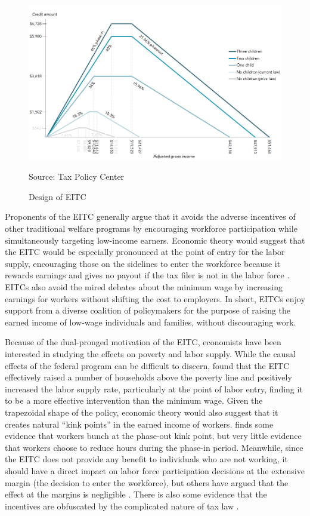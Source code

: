 \documentclass{article}
\begin{document}
 \begin{figure}[H]
    \caption{Design of EITC}
    \begin{center}
        \includegraphics[width=.85\textwidth]{eitc_design}
    \end{center}
	\footnotesize
    \label{fig:tax}{Source: Tax Policy Center}
\end{figure}

Proponents of the EITC generally argue that it avoids the adverse incentives of other traditional welfare programs by encouraging workforce participation while simultaneously targeting low-income earners. Economic theory would suggest that the EITC would be especially pronounced at the point of entry for the labor supply, encouraging those on the sidelines to enter the workforce because it rewards earnings and gives no payout if the tax filer is not in the labor force \citep{eissa2006behavioral}. EITCs also avoid the mired debates about the minimum wage by increasing earnings for workers without shifting the cost to employers. In short, EITCs enjoy support from a diverse coalition of policymakers for the purpose of raising the earned income of low-wage individuals and families, without discouraging work.

Because of the dual-pronged motivation of the EITC, economists have been interested in studying the effects on poverty and labor supply. While the causal effects of the federal program can be difficult to discern, \cite{neumark2001using} found that the EITC effectively raised a number of households above the poverty line and positively increased the labor supply rate, particularly at the point of labor entry, finding it to be a more effective intervention than the minimum wage. Given the trapezoidal shape of the policy, economic theory would also suggest that it creates natural “kink points” in the earned income of workers.  \cite{saez2010taxpayers} finds some evidence that workers bunch at the phase-out kink point, but very little evidence that workers choose to reduce hours during the phase-in period. Meanwhile, since the EITC does not provide any benefit to individuals who are not working, it should have a direct impact on labor force participation decisions at the extensive margin (the decision to enter the workforce), but others have argued that the effect at the margins is negligible \citep{kleven2019eitc}. There is also some evidence that the incentives are obfuscated by the complicated nature of tax law \citep{chetty2013teaching}.
\end{document}
